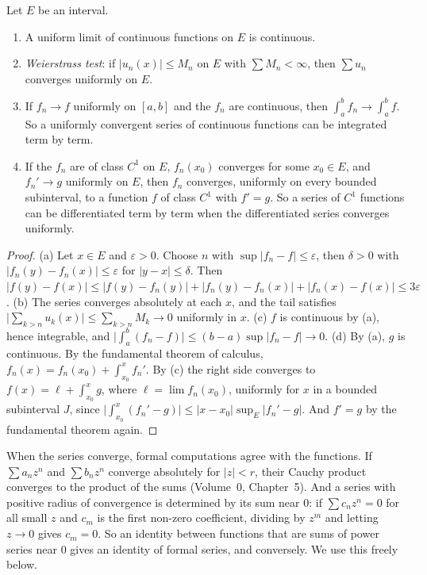 \begin{lemma}\label{lem:uniform}
Let $E$ be an interval.
\begin{enumerate}[label=(\alph*)]
\item A uniform limit of continuous functions on $E$ is continuous.
\item \emph{Weierstrass test}: if $|u_n(x)|\le M_n$ on $E$ with $\sum M_n<\infty$, then $\sum u_n$ converges uniformly on $E$.
\item If $f_n\to f$ uniformly on $[a,b]$ and the $f_n$ are continuous, then $\int_a^bf_n\to\int_a^bf$. So a uniformly convergent
series of continuous functions can be integrated term by term.
\item If the $f_n$ are of class $C^1$ on $E$, $f_n(x_0)$ converges for some $x_0\in E$, and $f_n'\to g$ uniformly on $E$, then $f_n$
converges, uniformly on every bounded subinterval, to a function $f$ of class $C^1$ with $f'=g$. So a series of $C^1$ functions can
be differentiated term by term when the differentiated series converges uniformly.
\end{enumerate}
\end{lemma}
\begin{proof}
(a) Let $x\in E$ and $\varepsilon>0$. Choose $n$ with $\sup|f_n-f|\le\varepsilon$, then $\delta>0$ with $|f_n(y)-f_n(x)|\le\varepsilon$ for
$|y-x|\le\delta$. Then $|f(y)-f(x)|\le|f(y)-f_n(y)|+|f_n(y)-f_n(x)|+|f_n(x)-f(x)|\le3\varepsilon$.
(b) The series converges absolutely at each $x$, and the tail satisfies $\bigl|\sum_{k>n}u_k(x)\bigr|\le\sum_{k>n}M_k\to0$ uniformly in $x$.
(c) $f$ is continuous by (a), hence integrable, and $\bigl|\int_a^b(f_n-f)\bigr|\le(b-a)\sup|f_n-f|\to0$.
(d) By (a), $g$ is continuous. By the fundamental theorem of calculus, $f_n(x)=f_n(x_0)+\int_{x_0}^xf_n'$. By (c) the right side
converges to $f(x)=\ell+\int_{x_0}^xg$, where $\ell=\lim f_n(x_0)$, uniformly for $x$ in a bounded subinterval $J$, since
$\bigl|\int_{x_0}^x(f_n'-g)\bigr|\le|x-x_0|\sup_E|f_n'-g|$. And $f'=g$ by the fundamental theorem again.
\end{proof}

\begin{remark}
When the series converge, formal computations agree with the functions. If $\sum a_nz^n$ and $\sum b_nz^n$ converge
absolutely for $|z|<r$, their Cauchy product converges to the product of the sums (Volume~0, Chapter~5). And a series
with positive radius of convergence is determined by its sum near $0$: if $\sum c_nz^n=0$ for all small $z$ and $c_m$ is
the first non-zero coefficient, dividing by $z^m$ and letting $z\to0$ gives $c_m=0$. So an identity between functions
that are sums of power series near $0$ gives an identity of formal series, and conversely. We use this freely below.
\end{remark}

